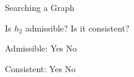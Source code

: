 \begin{problem}{Searching a Graph}
\begin{question}[4]
\solution{}{\ThreeCConsistentReason}

\end{question}

\begin{question}[4]
Is $h_2$ admissible? Is it consistent?

Admissible: \hspace{5mm}
\solution{\emptycircle}{\ThreeDAdmissibleYes} Yes
\hspace{5mm}
\solution{\emptycircle}{\ThreeDAdmissibleNo} No

\solution{}{\ThreeDAdmissibleReason}

Consistent: \hspace{5mm}
\solution{\emptycircle}{\ThreeDConsistentYes} Yes
\hspace{5mm}
\solution{\emptycircle}{\ThreeDConsistentNo} No

\solution{}{\ThreeDConsistentReason}


\end{question}

\end{problem}

